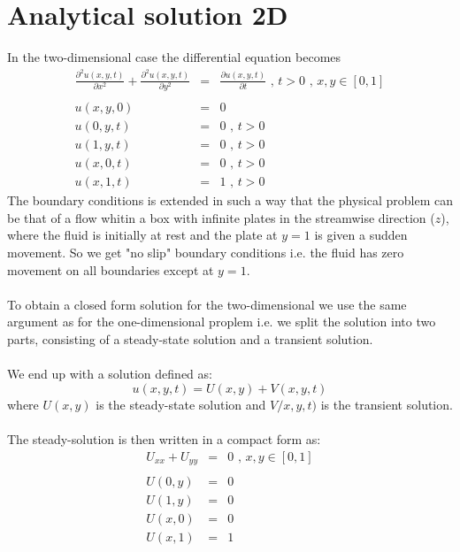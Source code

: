 \documentclass{article}
\begin{document}
\section*{Analytical solution 2D}
In the two-dimensional case the differential equation becomes
\begin{subequations}
\begin{eqnarray}
\frac{\partial^2 u(x,y,t)}{\partial x^2} + \frac{\partial^2 u(x,y,t)}{\partial y^2} &=&  \frac{\partial u(x,y,t)}{\partial t} \textit{ , } t>0 \textit{ , } x,y \in [0,1] \\ \nonumber \\
u(x,y,0) &=& 0 \textit{  } \\ 
u(0,y,t) &=& 0 \textit{ , } t> 0 \\
u(1,y,t) &=& 0 \textit{ , } t> 0 \\
u(x,0,t) &=& 0 \textit{ , } t> 0  \\
u(x,1,t) &=& 1 \textit{ , } t> 0 
\end{eqnarray}
\end{subequations}
The boundary conditions is extended in such a way that the physical problem can be that of a flow whitin a box with infinite plates in the streamwise direction ($z$), where the fluid is initially at rest and the plate at $y=1$ is given a sudden movement. So we get "no slip" boundary conditions i.e. the fluid has zero movement on all boundaries except at $y=1$.
\\
\\
To obtain a closed form solution for the two-dimensional we use the same argument as for the one-dimensional proplem i.e. we split the solution into two parts, consisting of a steady-state solution and a transient solution.\\
\\
We end up with a solution defined as:
\begin{equation}
u(x,y,t) = U(x,y) + V(x,y,t)
\end{equation}
where $U(x,y)$ is the steady-state solution and $V/x,y,t)$ is the transient solution.\\
\\
The steady-solution is then written in a compact form as:
\begin{subequations}
\begin{eqnarray}
U_{xx} + U_{yy} &=& 0 \textit{ , } x,y \in [0,1]\\ \nonumber
\\
U(0,y) &=& 0 \textit{  } \\
U(1,y) &=& 0 \textit{  } \\
U(x,0) &=& 0 \textit{  } \\
U(x,1) &=& 1 \textit{  } 
\end{eqnarray}
\end{subequations}
\end{document}

